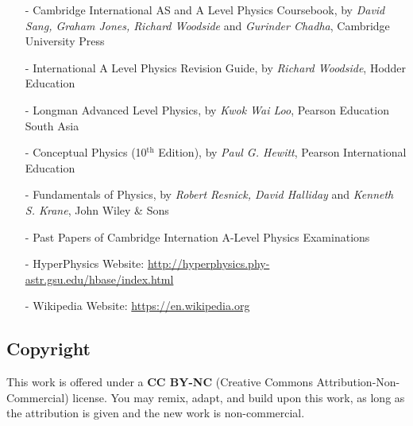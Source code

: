 \begin{itemize}
	\item[-] Cambridge International AS and A Level Physics Coursebook, by \textit{David Sang, Graham Jones, Richard Woodside} and \textit{Gurinder Chadha}, Cambridge University Press
	
	\item[-] International A Level Physics Revision Guide, by \textit{Richard Woodside}, Hodder Education
	
	\item[-] Longman Advanced Level Physics, by \textit{Kwok Wai Loo},	Pearson Education South Asia
	
	\item[-] Conceptual Physics (10$^\text{th}$ Edition), by \textit{Paul G. Hewitt}, Pearson International Education
	
	\item[-] Fundamentals of Physics, by \textit{Robert Resnick, David Halliday} and \textit{Kenneth S. Krane}, John Wiley \& Sons
	
	\item[-] Past Papers of Cambridge Internation A-Level Physics Examinations
	
	\item[-] HyperPhysics Website: \url{http://hyperphysics.phy-astr.gsu.edu/hbase/index.html}
	
	\item[-] Wikipedia Website: \url{https://en.wikipedia.org}
\end{itemize}

\subsection*{Copyright}

This work is offered under a \textbf{CC BY-NC} (Creative Commons Attribution-Non-Commercial) license. You may remix, adapt, and build upon this work, as long as the attribution is given and the new work is non-commercial.


